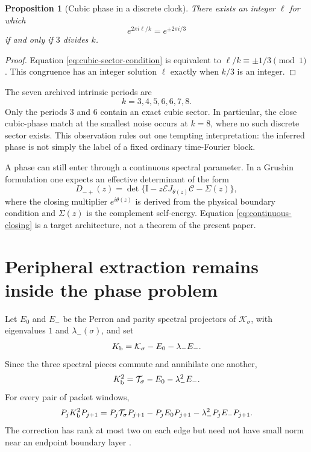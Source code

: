 \documentclass[11pt]{article}
\newtheorem{proposition}[theorem]{Proposition}
\theoremstyle{definition}
\theoremstyle{remark}
\newcommand{\Id}{\mathrm I}
\newcommand{\cK}{\mathcal K}
\newcommand{\cT}{\mathcal T}
\newcommand{\cC}{\mathcal C}
\newcommand{\cE}{\mathcal E}
\begin{document}
\begin{proposition}[Cubic phase in a discrete clock]
\label{prop:divisibility}
There exists an integer $\ell$ for which
\begin{equation}\label{eq:cubic-sector-condition}
 e^{2\pi i\ell/k}=e^{\pm2\pi i/3}
\end{equation}
if and only if $3$ divides $k$.
\end{proposition}

\begin{proof}
Equation \eqref{eq:cubic-sector-condition} is equivalent to
$\ell/k\equiv\pm1/3\pmod1$.  This congruence has an integer solution
$\ell$ exactly when $k/3$ is an integer.
\end{proof}

The seven archived intrinsic periods are
\begin{equation}\label{eq:period-list}
 k=3,4,5,6,6,7,8.
\end{equation}
Only the periods $3$ and $6$ contain an exact cubic sector.  In particular,
the close cubic-phase match at the smallest noise occurs at $k=8$, where no
such discrete sector exists.  This observation rules out one tempting
interpretation: the inferred phase is not simply the label of a fixed
ordinary time-Fourier block.

A phase can still enter through a continuous spectral parameter.  In a
Grushin formulation one expects an effective determinant of the form
\begin{equation}\label{eq:continuous-closing}
 D_{-+}(z)=
 \det\{\Id-z\cE J_{\theta(z)}\cC-\Sigma(z)\},
\end{equation}
where the closing multiplier $e^{i\theta(z)}$ is derived from the physical
boundary condition and $\Sigma(z)$ is the complement self-energy.  Equation
\eqref{eq:continuous-closing} is a target architecture, not a theorem of the
present paper.

\section{Peripheral extraction remains inside the phase problem}
\label{sec:deflation}

Let $E_0$ and $E_-$ be the Perron and parity spectral projectors of
$\cK_\sigma$, with eigenvalues $1$ and $\lambda_-(\sigma)$, and set
\begin{equation}\label{eq:bulk-K}
 K_{\rm b}=\cK_\sigma-E_0-\lambda_-E_-.
\end{equation}
Since the three spectral pieces commute and annihilate one another,
\begin{equation}\label{eq:bulk-square}
 K_{\rm b}^2
 =\cT_\sigma-E_0-\lambda_-^2E_-.
\end{equation}
For every pair of packet windows,
\begin{equation}\label{eq:localized-deflation}
 P_jK_{\rm b}^2P_{j+1}
 =P_j\cT_\sigma P_{j+1}
 -P_jE_0P_{j+1}
 -\lambda_-^2P_jE_-P_{j+1}.
\end{equation}
The correction has rank at most two on each edge but need not have small
norm near an endpoint boundary layer \citep{WangComplement2026}.
\end{document}
